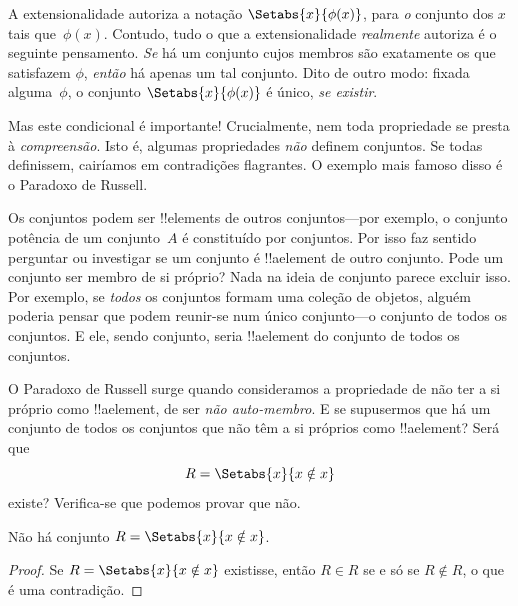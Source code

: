 \documentclass[../../../include/open-logic-section]{subfiles}
\begin{document}

A extensionalidade autoriza a notação $\Setabs{x}{\phi(x)}$, para
\emph{o} conjunto dos $x$ tais que~$\phi(x)$. Contudo, tudo o que a
extensionalidade \emph{realmente} autoriza é o seguinte pensamento.
\emph{Se} há um conjunto cujos membros são exatamente os que satisfazem $\phi$,
\emph{então} há apenas um tal conjunto. Dito de outro modo: fixada
alguma~$\phi$, o conjunto $\Setabs{x}{\phi(x)}$ é único, \emph{se existir}.

Mas este condicional é importante!{} Crucialmente, nem toda propriedade
se presta à \emph{compreensão}. Isto é, algumas propriedades \emph{não}
definem conjuntos. Se todas definissem, cairíamos em
contradições flagrantes. O exemplo mais famoso disso é o Paradoxo de Russell.

Os conjuntos podem ser !!{element}s de outros conjuntos---por exemplo, o conjunto potência
de um conjunto~$A$ é constituído por conjuntos. Por isso faz sentido perguntar ou
investigar se um conjunto é !!a{element} de outro conjunto. Pode um conjunto ser
membro de si próprio?  Nada na ideia de conjunto parece excluir
isso. Por exemplo, se \emph{todos} os conjuntos formam uma coleção de
objetos, alguém poderia pensar que podem reunir-se num único
conjunto---o conjunto de todos os conjuntos. E ele, sendo conjunto, seria !!a{element}
do conjunto de todos os conjuntos. 

O Paradoxo de Russell surge quando consideramos a propriedade de não ter
a si próprio como !!a{element}, de ser \emph{não auto-membro}. E se
supusermos que há um conjunto de todos os conjuntos que não têm a si próprios como
!!a{element}? Será que
\[
R = \Setabs{x}{x \notin x}
\]
existe? Verifica-se que podemos provar que não.

\begin{thm}
	Não há conjunto $R = \Setabs{x}{x \notin x}$.
\end{thm}

\begin{proof}
Se $R = \Setabs{x}{x \notin x}$ existisse, então
$R \in R$ se e só se $R \notin R$, o que é uma contradição.
\end{proof}
\end{document}
